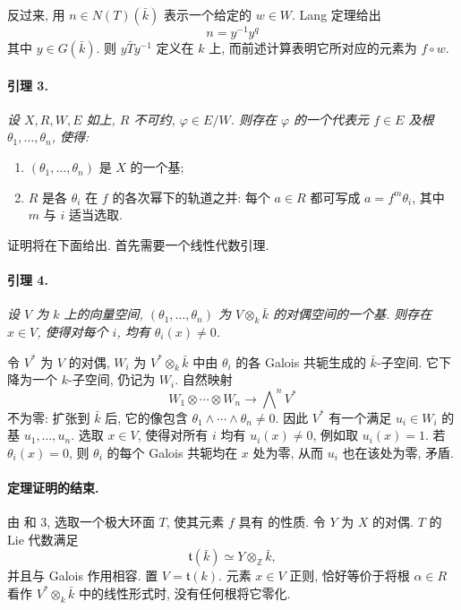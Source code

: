 反过来, 用 \(n\in N(T)(\bar k)\) 表示一个给定的 \(w\in W\). Lang 定理给出
\[
  n=y^{-1}y^q
\]
其中 \(y\in G(\bar k)\). 则 \(y\bar T y^{-1}\) 定义在 \(k\) 上, 而前述计算表明它所对应的元素为 \(f\circ w\).

\paragraph{\textbf{引理 3.}}
{\itshape 设 \(X,R,W,E\) 如上, \(R\) 不可约, \(\varphi\in E/W\). 则存在 \(\varphi\) 的一个代表元 \(f\in E\) 及根 \(\theta_1,\ldots,\theta_n\), 使得:
\begin{enumerate}
\item \((\theta_1,\ldots,\theta_n)\) 是 \(X\) 的一个基;
\item \(R\) 是各 \(\theta_i\) 在 \(f\) 的各次幂下的轨道之并: 每个 \(a\in R\) 都可写成 \(a=f^m\theta_i\), 其中 \(m\) 与 \(i\) 适当选取.
\end{enumerate}}

证明将在下面给出. 首先需要一个线性代数引理.

\paragraph{\textbf{引理 4.}}
{\itshape 设 \(V\) 为 \(k\) 上的向量空间, \((\theta_1,\ldots,\theta_n)\) 为 \(V\otimes_k\bar k\) 的对偶空间的一个基. 则存在 \(x\in V\), 使得对每个 \(i\), 均有 \(\theta_i(x)\ne0\).}

令 \(V^*\) 为 \(V\) 的对偶, \(W_i\) 为 \(V^*\otimes_k\bar k\) 中由 \(\theta_i\) 的各 Galois 共轭生成的 \(\bar k\)-子空间. 它下降为一个 \(k\)-子空间, 仍记为 \(W_i\). 自然映射
\[
  W_1\otimes\cdots\otimes W_n
     \longrightarrow\bigwedge\nolimits^n V^*
\]
不为零: 扩张到 \(\bar k\) 后, 它的像包含 \(\theta_1\wedge\cdots\wedge\theta_n\ne0\). 因此 \(V^*\) 有一个满足 \(u_i\in W_i\) 的基 \(u_1,\ldots,u_n\). 选取 \(x\in V\), 使得对所有 \(i\) 均有 \(u_i(x)\ne0\), 例如取 \(u_i(x)=1\). 若 \(\theta_i(x)=0\), 则 \(\theta_i\) 的每个 Galois 共轭均在 \(x\) 处为零, 从而 \(u_i\) 也在该处为零, 矛盾.

\paragraph{\textbf{定理证明的结束.}}

由 和 3, 选取一个极大环面 \(T\), 使其元素 \(f\) 具有 的性质. 令 \(Y\) 为 \(X\) 的对偶. \(T\) 的 Lie 代数满足
\[
  \mathfrak t(\bar k)\simeq Y\otimes_{\mathbb Z}\bar k,
\]
并且与 Galois 作用相容. 置 \(V=\mathfrak t(k)\). 元素 \(x\in V\) 正则, 恰好等价于将根 \(\alpha\in R\) 看作 \(V^*\otimes_k\bar k\) 中的线性形式时, 没有任何根将它零化.

